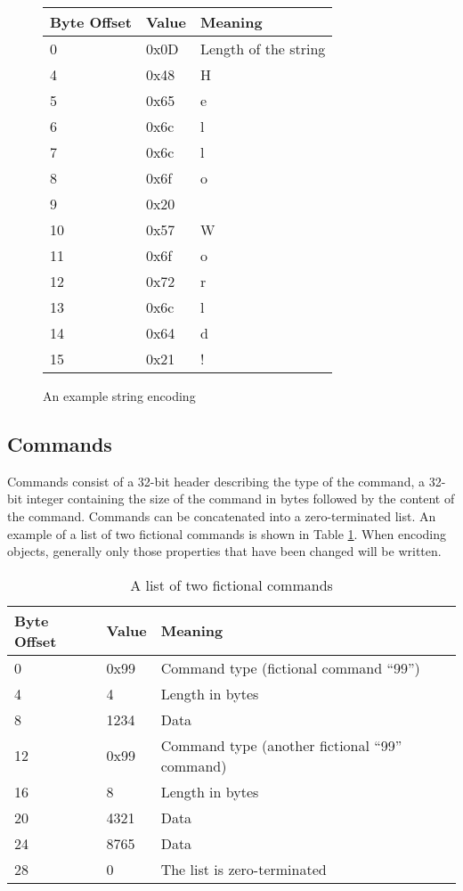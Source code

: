 \begin{figure}[p]
\center
\begin{tabular}{|l|l|l|}
\hline
Byte Offset & Value & Meaning\\
\hline
0 & 0x0D & Length of the string\\
4 & 0x48 & H\\
5 & 0x65 & e\\
6 & 0x6c & l\\
7 & 0x6c & l\\
8 & 0x6f & o\\
9 & 0x20 &  \\
10 & 0x57 & W\\
11 & 0x6f & o\\
12 & 0x72 & r\\
13 & 0x6c & l\\
14 & 0x64 & d\\
15 & 0x21 & !\\
\hline
\end{tabular}
\caption{An example string encoding}
\label{figure_example_string}
\end{figure}

\subsection{Commands}
Commands consist of a 32-bit header describing the type of the command, a 32-bit integer containing the size of the command in bytes followed by the content of the command. Commands can be concatenated into a zero-terminated list. An example of a list of two fictional commands is shown in Table \ref{table_fake_command_list}. When encoding objects, generally only those properties that have been changed will be written.

\begin{table}[p]
\center
\begin{tabular}{|l|l|l|}
\hline
Byte Offset & Value & Meaning\\
\hline
0 & 0x99 & Command type (fictional command ``99'')\\
4 & 4 & Length in bytes\\
8 & 1234 & Data \\
12 & 0x99 & Command type (another fictional ``99'' command)\\
16 & 8 & Length in bytes \\
20 & 4321 & Data\\
24 & 8765 & Data\\
28 & 0 & The list is zero-terminated\\
\hline
\end{tabular}
\caption{A list of two fictional commands}
\label{table_fake_command_list}
\end{table}


